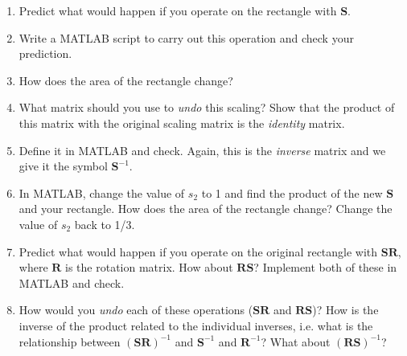 \begin{prob}
\begin{enumerate}
\item Predict what would happen if you operate on the rectangle with $\mathbf{S}$.
\item Write a MATLAB script to carry out this operation and check your prediction.
\item How does the area of the rectangle change?
\item What matrix should you use to \textit{undo} this scaling? Show that the product of this matrix with the original scaling matrix is the \textit{identity} matrix.
\item Define it in MATLAB and check. Again, this is the \textit{ inverse} matrix and we give it the symbol $\mathbf{S}^{-1}$.
\item In MATLAB, change the value of $s_2$ to 1 and find the product of the new $\mathbf{S}$ and your rectangle.  How does the area of the rectangle change?  Change the value of $s_2$ back to 1/3.
\item Predict what would happen if you operate on the original rectangle with $\mathbf{S} \mathbf{R}$, where $\mathbf{R}$ is the rotation matrix. How about $\mathbf{R} \mathbf{S}$? Implement both of these in MATLAB and check.
\item How would you \textit{ undo} each of these operations ($\mathbf{S} \mathbf{R}$ and $\mathbf{R} \mathbf{S}$)? How is the inverse of the product related to the individual inverses, i.e. what is the relationship between $(\mathbf{S} \mathbf{R})^{-1}$ and $\mathbf{S}^{-1}$ and $\mathbf{R}^{-1}$? What about $(\mathbf{R} \mathbf{S})^{-1}$?
\end{enumerate}
\end{prob}

